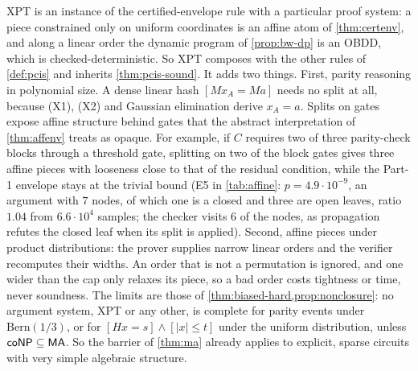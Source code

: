 XPT is an instance of the certified-envelope rule with a particular proof system: a
piece constrained only on uniform coordinates is an affine atom of \cref{thm:certenv},
and along a linear order the dynamic program of \cref{prop:bw-dp} is an OBDD, which is
checked-deterministic. So XPT composes with the other rules of \cref{def:pcis} and
inherits \cref{thm:pcis-sound}. It adds two things. First, parity reasoning in
polynomial size. A dense linear hash $[Mx_A=Ma]$ needs no split at all, because (X1),
(X2) and Gaussian elimination derive $x_A=a$. Splits on gates expose affine structure
behind gates that the abstract interpretation of \cref{thm:affenv} treats as opaque. For example, if $C$
requires two of three parity-check blocks through a threshold gate, splitting on two
of the block gates gives three affine pieces with looseness close to that of the residual
condition, while the Part-1 envelope stays at the trivial bound (E5 in \cref{tab:affine}:
$p=4.9\cdot10^{-9}$, an argument with $7$ nodes, of which one is a closed and three are
open leaves, ratio $1.04$ from $6.6\cdot10^4$ samples; the checker visits $6$ of the
nodes, as propagation refutes the closed leaf when its split is applied). Second, affine pieces
under product distributions: the prover supplies narrow linear orders and the verifier
recomputes their widths. An order that is not a permutation is ignored, and one wider
than the cap only relaxes its piece, so a bad order costs tightness or time, never
soundness. The limits
are those of \cref{thm:biased-hard,prop:nonclosure}: no argument system, XPT or any
other, is complete for parity events under $\mathrm{Bern}(1/3)$, or for
$[Hx=s]\wedge[|x|\le t]$ under the uniform distribution, unless $\mathsf{coNP}\subseteq\mathsf{MA}$.
So the barrier of \cref{thm:ma} already applies to explicit, sparse circuits with very
simple algebraic structure.
